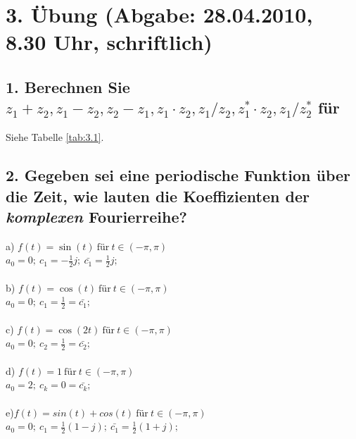 \section*{3. \"Ubung (Abgabe: 28.04.2010, 8.30 Uhr, schriftlich)}

\subsection*{1. Berechnen Sie $z_{1}+z_{2}, z_{1}-z_{2}, z_{2}-z_{1}, z_{1}\cdot z_{2}, z_{1}/z_{2}, z_{1}^{*}\cdot z_{2}, z_{1}/z_{2}^{*}$ f\"ur}
Siehe Tabelle \ref{tab:3.1}.



\subsection*{2. Gegeben sei eine periodische Funktion \"uber die Zeit, wie lauten die Koeffizienten der \emph{komplexen} Fourierreihe?}
a) $f(t) = \sin(t)~\text{f\"ur}~t \in (-\pi, \pi)$\\
$a_0 = 0; ~ c_{1} = -\frac{1}{2}j; ~ \bar{c_{1}} = \frac{1}{2}j;$\\\\
b) $f(t) = \cos(t)~\text{f\"ur}~t \in (-\pi, \pi)$\\
$a_0 = 0; ~ c_{1} = \frac{1}{2} = \bar{c_{1}};$\\\\
c) $f(t) = \cos(2t)~\text{f\"ur}~t \in (-\pi, \pi)$\\
$a_0 = 0; ~ c_{2} = \frac{1}{2} = \bar{c_{2}};$\\\\
d) $f(t) = 1~\text{f\"ur}~t \in (-\pi, \pi)$\\
$a_0 = 2; ~ c_{k} = 0 = \bar{c_{k}};$\\\\
e)$f(t)=sin(t)+cos(t)~\text{f\"ur}~t \in (-\pi, \pi)$\\
$a_0 = 0; ~ c_{1} = \frac{1}{2}(1-j); ~ \bar{c_{1}} = \frac{1}{2}(1+j);$\\\\

